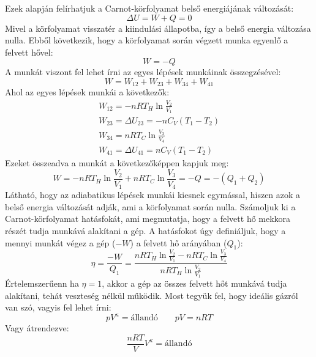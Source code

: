 \documentclass[a4paper,12pt]{article}
\begin{document}
Ezek alapján felírhatjuk a Carnot-körfolyamat belső energiájának változását:
\begin{equation}
    \Delta U = W + Q = 0
\end{equation}
Mivel a körfolyamat visszatér a kiindulási állapotba, így a belső energia változása nulla. Ebből következik, hogy a körfolyamat során végzett munka egyenlő a felvett hővel:
\begin{equation}
    W = - Q
\end{equation}
A munkát viszont fel lehet írni az egyes lépések munkáinak összegzésével:
\begin{equation}
    W = W_{12} + W_{23} + W_{34} + W_{41}
\end{equation}
Ahol az egyes lépések munkái a következők:
\begin{equation}
    \begin{aligned}
        W_{12} = - n R T_H \ln{\frac{V_2}{V_1}} \\
        W_{23} = \Delta U_{23} = - n C_V (T_1 - T_2) \\
        W_{34} = n R T_C \ln{\frac{V_3}{V_4}} \\
        W_{41} = \Delta U_{41} = n C_V (T_1 - T_2)
    \end{aligned}
\end{equation}
Ezeket összeadva a munkát a következőképpen kapjuk meg:
\begin{equation}
    W = - n R T_H \ln{\frac{V_2}{V_1}} + n R T_C \ln{\frac{V_3}{V_4}} = - Q = - (Q_1 + Q_2)
\end{equation}
Látható, hogy az adiabatikus lépések munkái kiesnek egymással, hiszen azok a belső energia változását adják, ami a körfolyamat során nulla.
Számoljuk ki a Carnot-körfolyamat hatásfokát, ami megmutatja, hogy a felvett hő mekkora részét tudja munkává alakítani a gép. A hatásfokot úgy definiáljuk, hogy a mennyi munkát végez a gép ($-W$) a felvett hő arányában ($Q_1$):
\begin{equation}
    \eta = \frac{- W}{Q_1} = \frac{n R T_H \ln{\frac{V_2}{V_1}} - n R T_C \ln{\frac{V_3}{V_4}}}{n R T_H \ln{\frac{V_2}{V_1}}}
\end{equation}
Értelemszerűenn ha $\eta = 1$, akkor a gép az összes felvett hőt munkává tudja alakítani, tehát veszteség nélkül működik.
Most tegyük fel, hogy ideális gázról van szó, vagyis fel lehet írni:
\begin{equation}
    p V^{\kappa} = \text{állandó} \qquad pV = n R T
\end{equation}
Vagy átrendezve:
\begin{equation}
    \frac{nRT}{V} V^{\kappa} = \text{állandó}
\end{equation}
\end{document}

